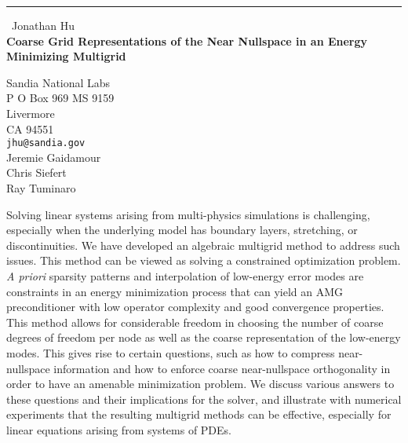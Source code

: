 \documentclass{report}
\begin{document}
\begin{center}
\rule{6in}{1pt} \
{\large Jonathan Hu \\
{\bf Coarse Grid Representations of the Near Nullspace in an Energy Minimizing Multigrid}}

Sandia National Labs \\ P O Box 969 MS 9159 \\ Livermore \\ CA 94551
\\
{\tt jhu@sandia.gov}\\
Jeremie Gaidamour\\
Chris Siefert\\
Ray Tuminaro\end{center}

Solving linear systems arising from multi-physics simulations is
challenging, especially when the underlying model has boundary layers,
stretching, or discontinuities. We have developed an algebraic multigrid
method to address such issues. This method can be viewed as solving a
constrained optimization problem. {\it A priori} sparsity patterns and
interpolation of low-energy error modes are constraints in an energy
minimization process that can yield an AMG preconditioner with low
operator complexity and good convergence properties. This method allows
for considerable freedom in choosing the number of coarse degrees of
freedom per node as well as the coarse representation of the low-energy
modes. This gives rise to certain questions, such as how to compress
near-nullspace information and how to enforce coarse near-nullspace
orthogonality in order to have an amenable minimization problem. We
discuss various answers to these questions and their implications for the
solver, and illustrate with numerical experiments that the resulting
multigrid methods can be effective, especially for linear equations
arising from systems of PDEs.
\end{document}
